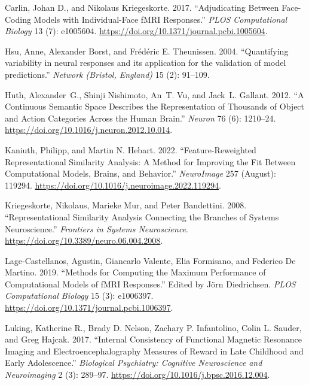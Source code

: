 \documentclass[
  letterpaper,
  DIV=11,
  numbers=noendperiod]{scrartcl}
\newlength{\cslhangindent}
\newlength{\cslentryspacingunit} %
\newenvironment{CSLReferences}[2] %
 {%
  \setlength{\parindent}{0pt}
  \ifodd #1
  \let\oldpar\par
  \def\par{\hangindent=\cslhangindent\oldpar}
  \fi
  \setlength{\parskip}{#2\cslentryspacingunit}
 }%
 {}
\begin{document}
\hypertarget{refs}{}
\begin{CSLReferences}{1}{0}
\leavevmode{}%
Carlin, Johan D., and Nikolaus Kriegeskorte. 2017. {``Adjudicating
Between Face-Coding Models with Individual-Face fMRI Responses.''}
\emph{PLOS Computational Biology} 13 (7): e1005604.
\url{https://doi.org/10.1371/journal.pcbi.1005604}.

\leavevmode{}%
Hsu, Anne, Alexander Borst, and Frédéric E. Theunissen. 2004.
{``Quantifying variability in neural responses and its application for
the validation of model predictions.''} \emph{Network (Bristol,
England)} 15 (2): 91--109.

\leavevmode{}%
Huth, Alexander~G., Shinji Nishimoto, An~T. Vu, and Jack~L. Gallant.
2012. {``A Continuous Semantic Space Describes the Representation of
Thousands of Object and Action Categories Across the Human Brain.''}
\emph{Neuron} 76 (6): 1210--24.
\url{https://doi.org/10.1016/j.neuron.2012.10.014}.

\leavevmode{}%
Kaniuth, Philipp, and Martin N. Hebart. 2022. {``Feature-Reweighted
Representational Similarity Analysis: A Method for Improving the Fit
Between Computational Models, Brains, and Behavior.''} \emph{NeuroImage}
257 (August): 119294.
\url{https://doi.org/10.1016/j.neuroimage.2022.119294}.

\leavevmode{}%
Kriegeskorte, Nikolaus, Marieke Mur, and Peter Bandettini. 2008.
{``Representational Similarity Analysis {\textendash} Connecting the
Branches of Systems Neuroscience.''} \emph{Frontiers in Systems
Neuroscience}. \url{https://doi.org/10.3389/neuro.06.004.2008}.

\leavevmode{}%
Lage-Castellanos, Agustin, Giancarlo Valente, Elia Formisano, and
Federico De Martino. 2019. {``Methods for Computing the Maximum
Performance of Computational Models of fMRI Responses.''} Edited by Jörn
Diedrichsen. \emph{PLOS Computational Biology} 15 (3): e1006397.
\url{https://doi.org/10.1371/journal.pcbi.1006397}.

\leavevmode{}%
Luking, Katherine R., Brady D. Nelson, Zachary P. Infantolino, Colin L.
Sauder, and Greg Hajcak. 2017. {``Internal Consistency of Functional
Magnetic Resonance Imaging and Electroencephalography Measures of Reward
in Late Childhood and Early Adolescence.''} \emph{Biological Psychiatry:
Cognitive Neuroscience and Neuroimaging} 2 (3): 289--97.
\url{https://doi.org/10.1016/j.bpsc.2016.12.004}.


\end{CSLReferences}
\end{document}
